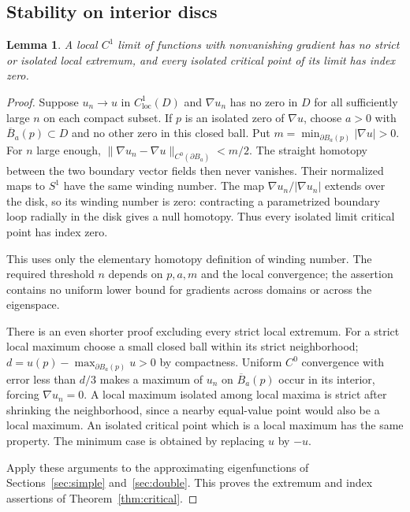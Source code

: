 \documentclass[11pt]{article}
\newtheorem{lemma}[theorem]{Lemma}
\theoremstyle{definition}
\theoremstyle{remark}
\numberwithin{equation}{section}
\begin{document}
\subsection{Stability on interior discs}\label{subsec:6.1}
\begin{lemma}\label{lem:index-stability}
A local $C^1$ limit of functions with nonvanishing gradient has no strict or isolated local extremum, and every isolated critical point of its limit has index zero.
\end{lemma}
\begin{proof}

Suppose $u_n\to u$ in $C^1_{\mathrm{loc}}(D)$ and $\nabla u_n$ has no zero in $D$ for all sufficiently large $n$ on each compact subset. If $p$ is an isolated zero of $\nabla u$, choose $a>0$ with $\overline B_a(p)\subset D$ and no other zero in this closed ball. Put $m=\min_{\partial B_a(p)}|\nabla u|>0$. For $n$ large enough, $\|\nabla u_n-\nabla u\|_{C^0(\partial B_a)}<m/2$. The straight homotopy between the two boundary vector fields then never vanishes. Their normalized maps to $S^1$ have the same winding number. The map $\nabla u_n/|\nabla u_n|$ extends over the disk, so its winding number is zero: contracting a parametrized boundary loop radially in the disk gives a null homotopy. Thus every isolated limit critical point has index zero.

This uses only the elementary homotopy definition of winding number. The required threshold $n$ depends on $p,a,m$ and the local convergence; the assertion contains no uniform lower bound for gradients across domains or across the eigenspace.

There is an even shorter proof excluding every strict local extremum. For a strict local maximum choose a small closed ball within its strict neighborhood; $d=u(p)-\max_{\partial B_a(p)}u>0$ by compactness. Uniform $C^0$ convergence with error less than $d/3$ makes a maximum of $u_n$ on $\overline B_a(p)$ occur in its interior, forcing $\nabla u_n=0$. A local maximum isolated among local maxima is strict after shrinking the neighborhood, since a nearby equal-value point would also be a local maximum. An isolated critical point which is a local maximum has the same property. The minimum case is obtained by replacing $u$ by $-u$.

Apply these arguments to the approximating eigenfunctions of Sections~\ref{sec:simple} and~\ref{sec:double}. This proves the extremum and index assertions of Theorem~\ref{thm:critical}.

\end{proof}
\end{document}
